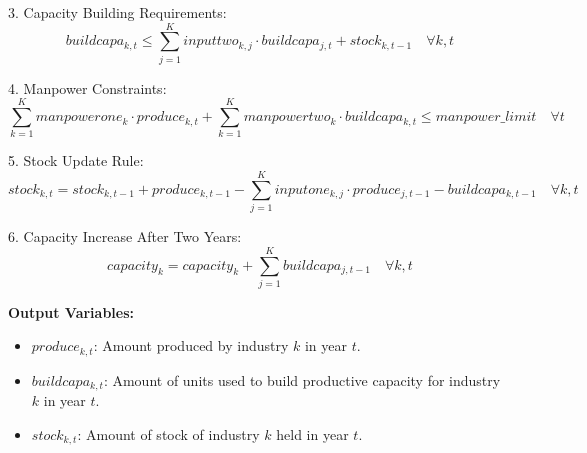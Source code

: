 \documentclass{article}
\begin{document}
3. Capacity Building Requirements:
\[
buildcapa_{k, t} \leq \sum_{j=1}^{K} inputtwo_{k,j} \cdot buildcapa_{j, t} + stock_{k, t-1} \quad \forall k, t
\]

4. Manpower Constraints:
\[
\sum_{k=1}^{K} manpowerone_{k} \cdot produce_{k, t} + \sum_{k=1}^{K} manpowertwo_{k} \cdot buildcapa_{k, t} \leq manpower\_limit \quad \forall t
\]

5. Stock Update Rule:
\[
stock_{k, t} = stock_{k, t-1} + produce_{k, t-1} - \sum_{j=1}^{K} inputone_{k,j} \cdot produce_{j, t-1} - buildcapa_{k, t-1} \quad \forall k, t
\]

6. Capacity Increase After Two Years:
\[
capacity_{k} = capacity_{k} + \sum_{j=1}^{K} buildcapa_{j, t-1} \quad \forall k, t
\]

\textbf{Output Variables:}
\begin{itemize}
    \item \( produce_{k, t} \): Amount produced by industry \( k \) in year \( t \).
    \item \( buildcapa_{k, t} \): Amount of units used to build productive capacity for industry \( k \) in year \( t \).
    \item \( stock_{k, t} \): Amount of stock of industry \( k \) held in year \( t \).
\end{itemize}
\end{document}
